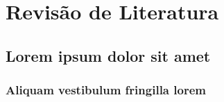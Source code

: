 
\part{Revisão de Literatura}


\chapter{Lorem ipsum dolor sit amet}

\section{Aliquam vestibulum fringilla lorem}

\lipsum[1]

\lipsum[2-3]